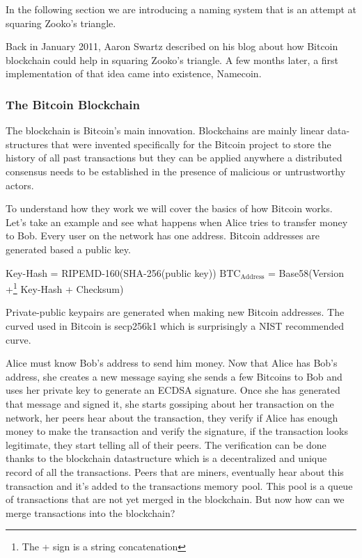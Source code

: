 \documentclass{vldb}
\begin{document}
In the following section we are introducing a naming system that is an attempt at squaring Zooko's triangle.

Back in January 2011, Aaron Swartz described on his blog about how Bitcoin blockchain could help in squaring Zooko's triangle. A few months later, a first implementation of that idea came into existence, Namecoin.

\subsubsection{The Bitcoin Blockchain}

The blockchain is Bitcoin's main innovation. Blockchains are mainly linear data-structures that were invented specifically for the Bitcoin project to store the history of all past transactions but they can be applied anywhere a distributed consensus needs to be established in the presence of malicious or untrustworthy actors.

To understand how they work we will cover the basics of how Bitcoin works. Let's take an example and see what happens when Alice tries to transfer money to Bob. Every user on the network has one address. Bitcoin addresses are generated based a public key. 
\begin{center}
Key-Hash = RIPEMD-160(SHA-256(public key))
$\text{BTC}_{\text{Address}}$ = Base58(Version +\footnote{The + sign is a string concatenation} Key-Hash + Checksum)
\end{center}

Private-public keypairs are generated when making new Bitcoin addresses. The curved used in Bitcoin is secp256k1 which is surprisingly a NIST recommended curve.\cite{VOID}

Alice must know Bob's address to send him money. Now that Alice has Bob's address, she creates a new message saying she sends a few Bitcoins to Bob and uses her private key to generate an ECDSA signature. Once she has generated that message and signed it, she starts gossiping about her transaction on the network, her peers hear about the transaction, they verify if Alice has enough money to make the transaction and verify the signature, if the transaction looks legitimate, they start telling all of their peers. The verification can be done thanks to the blockchain datastructure which is a decentralized and unique record of all the transactions. Peers that are miners, eventually hear about this transaction and it's added to the transactions memory pool. This pool is a queue of transactions that are not yet merged in the blockchain. But now how can we merge transactions into the blockchain? 
\end{document}
